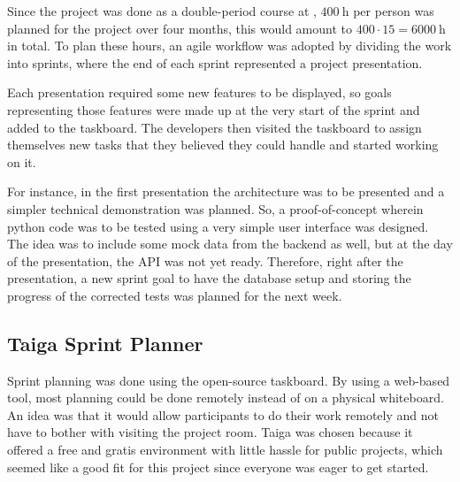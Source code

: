 Since the project was done as a double-period course at \LTU, $\SI{400}{\hour}$ per person was planned for the project over four months, this would amount to $400\cdot15=\SI{6000}{\hour}$ in total. To plan these hours, an agile workflow was adopted by dividing the work into sprints, where the end of each sprint represented a project presentation.

Each presentation required some new features to be displayed, so goals representing those features were made up at the very start of the sprint and added to the taskboard. The developers then visited the taskboard to assign themselves new tasks that they believed they could handle and started working on it.

For instance, in the first presentation the architecture was to be presented and a simpler technical demonstration was planned. So, a proof-of-concept wherein python code was to be tested using a very simple user interface was designed. The idea was to include some mock data from the backend as well, but at the day of the presentation, the API was not yet ready. Therefore, right after the presentation, a new sprint goal to have the database setup and storing the progress of the corrected tests was planned for the next week.

\subsection{Taiga Sprint Planner}
Sprint planning was done using the open-source \taiga{} taskboard. By using a web-based tool, most planning could be done remotely instead of on a physical whiteboard. An idea was that it would allow participants to do their work remotely and not have to bother with visiting the project room. Taiga was chosen because it offered a free and gratis environment with little hassle for public projects, which seemed like a good fit for this project since everyone was eager to get started.


